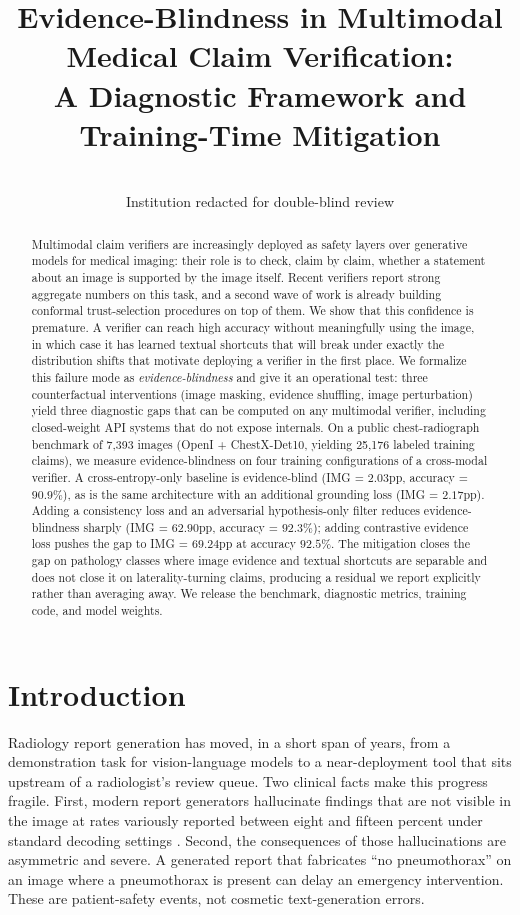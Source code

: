 \documentclass[pmlr]{jmlr}
\title[Evidence-Blindness in Multimodal Medical Claim Verification]{Evidence-Blindness in Multimodal Medical Claim Verification:\\ A Diagnostic Framework and Training-Time Mitigation}
\author{\Name{Anonymous Author(s)}
       \Email{anonymous@submission}\\
       \addr Institution redacted for double-blind review}
\begin{document}
\maketitle

\begin{abstract}
Multimodal claim verifiers are increasingly deployed as safety layers over generative models for medical imaging: their role is to check, claim by claim, whether a statement about an image is supported by the image itself. Recent verifiers report strong aggregate numbers on this task, and a second wave of work is already building conformal trust-selection procedures on top of them. We show that this confidence is premature. A verifier can reach high accuracy without meaningfully using the image, in which case it has learned textual shortcuts that will break under exactly the distribution shifts that motivate deploying a verifier in the first place. We formalize this failure mode as \emph{evidence-blindness} and give it an operational test: three counterfactual interventions (image masking, evidence shuffling, image perturbation) yield three diagnostic gaps that can be computed on any multimodal verifier, including closed-weight API systems that do not expose internals. On a public chest-radiograph benchmark of 7{,}393 images (OpenI + ChestX-Det10, yielding 25{,}176 labeled training claims), we measure evidence-blindness on four training configurations of a cross-modal verifier. A cross-entropy-only baseline is evidence-blind (IMG = $2.03$pp, accuracy = $90.9\%$), as is the same architecture with an additional grounding loss (IMG = $2.17$pp). Adding a consistency loss and an adversarial hypothesis-only filter reduces evidence-blindness sharply (IMG = $62.90$pp, accuracy = $92.3\%$); adding contrastive evidence loss pushes the gap to IMG = $69.24$pp at accuracy $92.5\%$. The mitigation closes the gap on pathology classes where image evidence and textual shortcuts are separable and does not close it on laterality-turning claims, producing a residual we report explicitly rather than averaging away. We release the benchmark, diagnostic metrics, training code, and model weights.
\end{abstract}

\section{Introduction}

Radiology report generation has moved, in a short span of years, from a demonstration task for vision-language models to a near-deployment tool that sits upstream of a radiologist's review queue. Two clinical facts make this progress fragile. First, modern report generators hallucinate findings that are not visible in the image at rates variously reported between eight and fifteen percent under standard decoding settings \citep{zhang2024radflag,hardy2024rextrust}. Second, the consequences of those hallucinations are asymmetric and severe. A generated report that fabricates ``no pneumothorax'' on an image where a pneumothorax is present can delay an emergency intervention. These are patient-safety events, not cosmetic text-generation errors.
\end{document}

